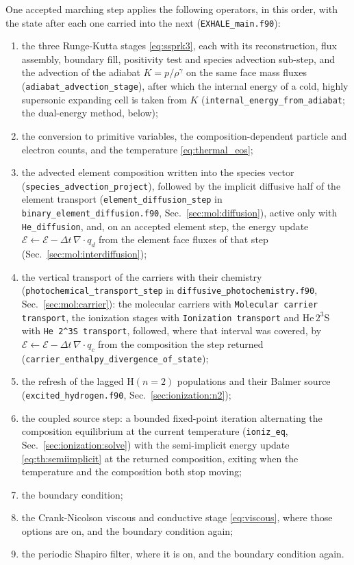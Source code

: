 One accepted marching step applies the following operators, in this order,
with the state after each one carried into the next
(\texttt{EXHALE\_main.f90}):
%
\begin{enumerate}
\item the three Runge-Kutta stages \eqref{eq:ssprk3}, each with its
      reconstruction, flux assembly, boundary fill, positivity test and
      species advection sub-step, and the advection of the adiabat
      $K = p/\rho^\gamma$ on the same face mass fluxes
      (\texttt{adiabat\_advection\_stage}), after which the internal energy
      of a cold, highly supersonic expanding cell is taken from $K$
      (\texttt{internal\_energy\_from\_adiabat}; the dual-energy method,
      below);
\item the conversion to primitive variables, the composition-dependent
      particle and electron counts, and the temperature
      \eqref{eq:thermal_eos};
\item the advected element composition written into the species vector
      (\texttt{species\_advection\_project}), followed by the implicit
      diffusive half of the element transport
      (\texttt{element\_diffusion\_step} in
      \texttt{binary\_element\_diffusion.f90}, Sec.~\ref{sec:mol:diffusion}),
      active only with \texttt{He\_diffusion}, and, on an accepted element
      step, the energy update $\mathcal{E} \leftarrow \mathcal{E} - \Delta
      t\,\nabla\!\cdot q_d$ from the element face fluxes of that step
      (Sec.~\ref{sec:mol:interdiffusion});
\item the vertical transport of the carriers with their chemistry
      (\texttt{photochemical\_transport\_step} in
      \texttt{diffusive\_photochemistry.f90}, Sec.~\ref{sec:mol:carrier}):
      the molecular carriers with \texttt{Molecular carrier transport}, the
      ionization stages with \texttt{Ionization transport} and He\,$2^3$S with
      \texttt{He 2\^{}3S transport}, followed, where that interval was
      covered, by $\mathcal{E} \leftarrow \mathcal{E} - \Delta
      t\,\nabla\!\cdot q_c$ from the composition the step returned
      (\texttt{carrier\_enthalpy\_divergence\_of\_state});
\item the refresh of the lagged $\mathrm{H}(n{=}2)$ populations and their
      Balmer source (\texttt{excited\_hydrogen.f90},
      Sec.~\ref{sec:ionization:n2});
\item the coupled source step: a bounded fixed-point iteration alternating
      the composition equilibrium at the current temperature
      (\texttt{ioniz\_eq}, Sec.~\ref{sec:ionization:solve}) with the
      semi-implicit energy update \eqref{eq:th:semiimplicit} at the returned
      composition, exiting when the temperature and the composition both stop
      moving;
\item the boundary condition;
\item the Crank-Nicolson viscous and conductive stage
      \eqref{eq:viscous}, where those options are on, and the boundary
      condition again;
\item the periodic Shapiro filter, where it is on, and the boundary
      condition again.
\end{enumerate}

